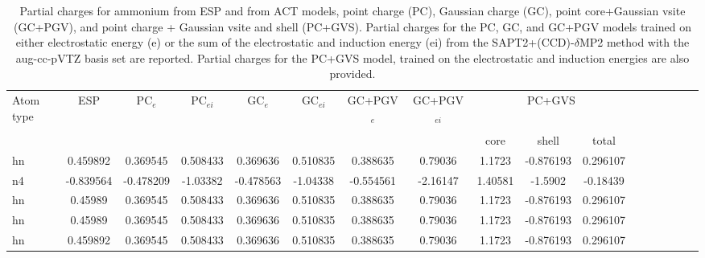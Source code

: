 \begin{sidewaystable}
\caption{Partial charges for ammonium from ESP and from ACT models, point charge (PC), Gaussian charge (GC), point core+Gaussian vsite (GC+PGV), and point charge + Gaussian vsite and shell (PC+GVS).  Partial charges for the PC, GC, and GC+PGV models trained on either electrostatic energy (e) or the sum of the electrostatic and induction energy (ei) from the SAPT2+(CCD)-$\delta$MP2 method with the aug-cc-pVTZ basis set are reported. Partial charges for the PC+GVS model, trained on the electrostatic and induction energies are also provided.}
\hspace{-1cm}
\begin{tabular}{lcccccccccccccccc}
\hline
 Atom type & ESP & PC$_{e}$ & PC$_{ei}$ & GC$_{e}$ & GC$_{ei}$ & GC+PGV$_{e}$ & GC+PGV$_{ei}$ & \multicolumn{3}{c}{PC+GVS} \\\\
 & & & & & & & & core & shell & total \\
\hline
 hn & 0.459892 & 0.369545 & 0.508433 & 0.369636 &  0.510835 & 0.388635 &  0.79036 & 1.1723 & -0.876193 & 0.296107 \\
 n4 & -0.839564 & -0.478209 & -1.03382 & -0.478563 &  -1.04338 & -0.554561 &  -2.16147 & 1.40581 & -1.5902 & -0.18439 \\
 hn & 0.45989 & 0.369545 & 0.508433 & 0.369636 &  0.510835 & 0.388635 &  0.79036 & 1.1723 & -0.876193 & 0.296107 \\
 hn & 0.45989 & 0.369545 & 0.508433 & 0.369636 &  0.510835 & 0.388635 &  0.79036 & 1.1723 & -0.876193 & 0.296107 \\
 hn & 0.459892 & 0.369545 & 0.508433 & 0.369636 &  0.510835 & 0.388635 &  0.79036 & 1.1723 & -0.876193 & 0.296107 \\
\hline
\end{tabular}
\end{sidewaystable}
